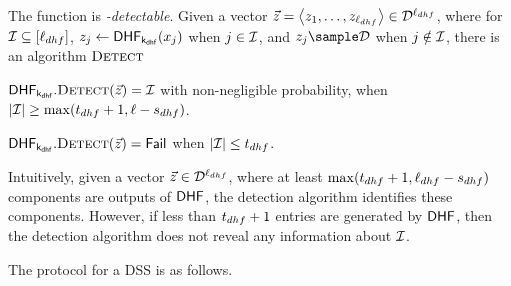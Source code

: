 \item The function is \textit{\dhfParamRandThreshold-detectable}. 
  Given a vector $\genericVec = \tupleDefn{\genericVec[1], \dots, 
    \genericVec[\dhfLength]} \in \dhfDomain^{\dhfLength}$, where for $\matchedIndexSet 
  \subseteq \nats[\dhfLength]$, $\genericVec[\projIdx] \gets 
  \dhf[\dhfKey](\genericFnInput[\projIdx])$ when $\projIdx \in \matchedIndexSet$, 
  and $\genericVec[\projIdx] \getsr \dhfDomain$ when $\projIdx \notin \matchedIndexSet$, 
  there is an algorithm $\textsc{Detect}$   
	\itemListStart
  \item $\dhf[\dhfKey].\dhfDetect(\genericVec) =
    \matchedIndexSet$ with non-negligible probability,
    when $\setSize{\matchedIndexSet} \ge
    \max(\dhfParamMatchThreshold+1, \genericVecLen -
    \dhfParamRandThreshold)$.
  \item $\dhf[\dhfKey].\dhfDetect(\genericVec) =
    \dhfFail$ when $\setSize{\matchedIndexSet} \le
    \dhfParamMatchThreshold$.
\itemListEnd
\enumListEnd
  

  Intuitively, given a vector $\genericVec \in
  \dhfDomain^{\dhfLength}$, where at least
  $\max(t_{dhf}+1, \ell_{dhf} - s_{dhf})$ 
  components are outputs of $\dhf$,
  the detection algorithm identifies these components. However,
  if less than $t_{dhf}+1$ entries are generated
  by $\dhf$, then the detection algorithm does not reveal any
  information about $\matchedIndexSet$.		


The protocol for a DSS is as follows. 


